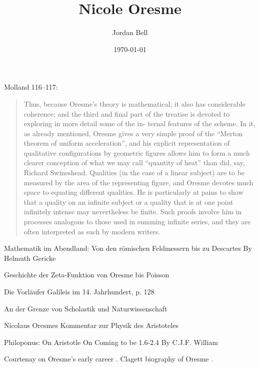 \documentclass{amsart}
\theoremstyle{definition}
\begin{document}
\title{Nicole Oresme}
\author{Jordan Bell}
\address{Department of Mathematics, University of Toronto, Toronto, Ontario, Canada}
\date{\today}

\maketitle

Molland 116--117:

\begin{quote}
Thus, because Oresme's theory is
mathematical, it also has considerable coherence; and the third and final
part of the treatise is devoted to exploring in more detail some of the in-
ternal features of the scheme. In it, as already mentioned, Oresme gives
a very simple proof of the ``Merton theorem of uniform acceleration'',
and his explicit representation of qualitative configurations by geometric
figures allows him to form a much clearer conception of what we may call
``quantity of heat'' than did, say, Richard Swineshead. Qualities (in the
case of a linear subject) are to be measured by the area of the representing
figure, and Oresme devotes much space to equating different qualities.
He is particularly at pains to show that a quality on an infinite subject or
a quality that is at one point infinitely intense may nevertheless be finite.
Such proofs involve him in processes analogous to those used in summing
infinite series, and they are often interpreted as such by modern writers.
\end{quote}

Mathematik im Abendland: Von den römischen Feldmessern bis zu Descartes
By Helmuth Gericke

Geschichte der Zeta-Funktion von Oresme bis Poisson

Die Vorläufer Galileis im 14. Jahrhundert, p. 128

An der Grenze von Scholastik und Naturwissenschaft

Nicolaus Oresmes Kommentar zur Physik des Aristoteles

Philoponus: On Aristotle On Coming to be 1.6-2.4
By C.J.F. William


Courtenay on Oresme's early career \cite{courtenay}. Clagett biography of Oresme \cite{dictionary}.
 
\end{document}
